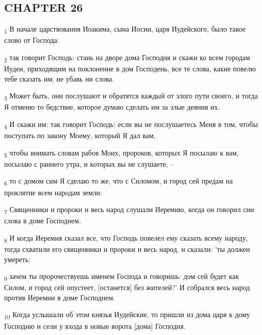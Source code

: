\subsection{CHAPTER 26}
\begin{tcolorbox}
\textsubscript{1} В начале царствования Иоакима, сына Иосии, царя Иудейского, было такое слово от Господа:
\end{tcolorbox}
\begin{tcolorbox}
\textsubscript{2} так говорит Господь: стань на дворе дома Господня и скажи ко всем городам Иудеи, приходящим на поклонение в дом Господень, все те слова, какие повелю тебе сказать им; не убавь ни слова.
\end{tcolorbox}
\begin{tcolorbox}
\textsubscript{3} Может быть, они послушают и обратятся каждый от злого пути своего, и тогда Я отменю то бедствие, которое думаю сделать им за злые деяния их.
\end{tcolorbox}
\begin{tcolorbox}
\textsubscript{4} И скажи им: так говорит Господь: если вы не послушаетесь Меня в том, чтобы поступать по закону Моему, который Я дал вам,
\end{tcolorbox}
\begin{tcolorbox}
\textsubscript{5} чтобы внимать словам рабов Моих, пророков, которых Я посылаю к вам, посылаю с раннего утра, и которых вы не слушаете, --
\end{tcolorbox}
\begin{tcolorbox}
\textsubscript{6} то с домом сим Я сделаю то же, что с Силомом, и город сей предам на проклятие всем народам земли.
\end{tcolorbox}
\begin{tcolorbox}
\textsubscript{7} Священники и пророки и весь народ слушали Иеремию, когда он говорил сии слова в доме Господнем.
\end{tcolorbox}
\begin{tcolorbox}
\textsubscript{8} И когда Иеремия сказал все, что Господь повелел ему сказать всему народу, тогда схватили его священники и пророки и весь народ, и сказали: 'ты должен умереть;
\end{tcolorbox}
\begin{tcolorbox}
\textsubscript{9} зачем ты пророчествуешь именем Господа и говоришь: дом сей будет как Силом, и город сей опустеет, [останется] без жителей?' И собрался весь народ против Иеремии в доме Господнем.
\end{tcolorbox}
\begin{tcolorbox}
\textsubscript{10} Когда услышали об этом князья Иудейские, то пришли из дома царя к дому Господню и сели у входа в новые ворота [дома] Господня.
\end{tcolorbox}
